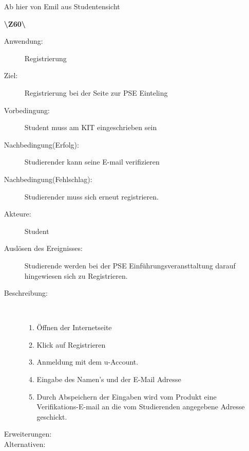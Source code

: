 \documentclass[a4paper]{article}
\begin{document}
\begin{enumerate}
Ab hier von Emil aus Studentensicht

\item[\textbf{\textbackslash Z60\textbackslash}] \begin{description}
    \item[Anwendung:] Registrierung
    \item[Ziel:] Registrierung bei der Seite zur PSE Einteling
    \item[Vorbedingung:] Student muss am KIT eingeschrieben sein
    \item[Nachbedingung(Erfolg):] Studierender kann seine E-mail verifizieren
    \item[Nachbedingung(Fehlschlag):] Studierender muss sich erneut
    registrieren.
    \item[Akteure:] Student
    \item[Auslösen des Ereignisses:] Studierende werden bei der PSE
    Einführungsveransttaltung darauf hingewiesen sich zu Registrieren.
    \item[Beschreibung:]~
    \begin{enumerate}[1.]
      \item Öffnen der Internetseite
      \item Klick auf Registrieren
      \item Anmeldung mit dem u-Account.
      \item Eingabe des Namen's und der E-Mail Adresse 
      \item Durch Abspeichern der Eingaben wird vom Produkt eine
      Verifikations-E-mail an die vom Studierenden angegebene Adresse geschickt.
    \end{enumerate}
    \item[Erweiterungen:]
    \item[Alternativen:]~ 
      \end{description}
  \pagebreak
  

\end{enumerate}
\end{document}

